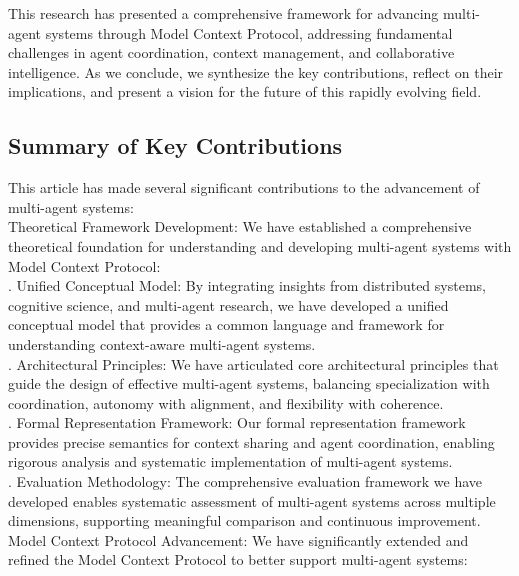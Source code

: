 This research has presented a comprehensive framework for advancing multi-agent systems through Model Context Protocol, addressing fundamental challenges in agent coordination, context management, and collaborative intelligence. As we conclude, we synthesize the key contributions, reflect on their implications, and present a vision for the future of this rapidly evolving field.\\
\subsection{Summary of Key Contributions}
This article has made several significant contributions to the advancement of multi-agent systems:\\ \newline
Theoretical Framework Development: We have established a comprehensive theoretical foundation for understanding and developing multi-agent systems with Model Context Protocol:\\ . Unified Conceptual Model: By integrating insights from distributed systems, cognitive science, and multi-agent research, we have developed a unified conceptual model that provides a common language and framework for understanding context-aware multi-agent systems.\\ . Architectural Principles: We have articulated core architectural principles that guide the design of effective multi-agent systems, balancing specialization with coordination, autonomy with alignment, and flexibility with coherence.\\ . Formal Representation Framework: Our formal representation framework provides precise semantics for context sharing and agent coordination, enabling rigorous analysis and systematic implementation of multi-agent systems.\\ . Evaluation Methodology: The comprehensive evaluation framework we have developed enables systematic assessment of multi-agent systems across multiple dimensions, supporting meaningful comparison and continuous improvement.\\ \newline
Model Context Protocol Advancement: We have significantly extended and refined the Model Context Protocol to better support multi-agent systems:\\ \newline
